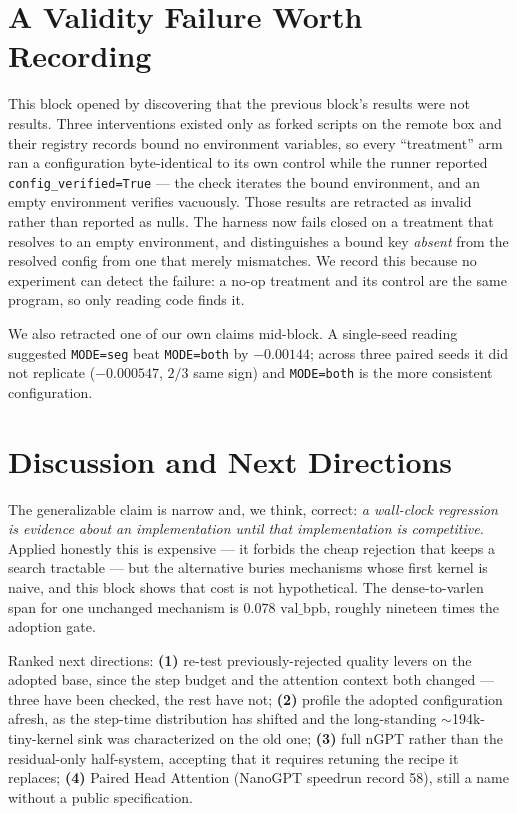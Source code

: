 \documentclass{article}
\newcommand{\valbpb}{\mathrm{val\_bpb}}
\begin{document}
\section{A Validity Failure Worth Recording}
This block opened by discovering that the previous block's results were not results. Three interventions existed only as forked scripts on the remote box and their registry records bound no environment variables, so every ``treatment'' arm ran a configuration byte-identical to its own control while the runner reported \texttt{config\_verified=True} --- the check iterates the bound environment, and an empty environment verifies vacuously. Those results are retracted as invalid rather than reported as nulls. The harness now fails closed on a treatment that resolves to an empty environment, and distinguishes a bound key \emph{absent} from the resolved config from one that merely mismatches. We record this because no experiment can detect the failure: a no-op treatment and its control are the same program, so only reading code finds it.

We also retracted one of our own claims mid-block. A single-seed reading suggested \texttt{MODE=seg} beat \texttt{MODE=both} by $-0.00144$; across three paired seeds it did not replicate ($-0.000547$, $2/3$ same sign) and \texttt{MODE=both} is the more consistent configuration.

\section{Discussion and Next Directions}
The generalizable claim is narrow and, we think, correct: \emph{a wall-clock regression is evidence about an implementation until that implementation is competitive.} Applied honestly this is expensive --- it forbids the cheap rejection that keeps a search tractable --- but the alternative buries mechanisms whose first kernel is naive, and this block shows that cost is not hypothetical. The dense-to-varlen span for one unchanged mechanism is $0.078$ $\valbpb$, roughly nineteen times the adoption gate.

Ranked next directions: \textbf{(1)} re-test previously-rejected quality levers on the adopted base, since the step budget and the attention context both changed --- three have been checked, the rest have not; \textbf{(2)} profile the adopted configuration afresh, as the step-time distribution has shifted and the long-standing $\sim$194k-tiny-kernel sink was characterized on the old one; \textbf{(3)} full nGPT rather than the residual-only half-system, accepting that it requires retuning the recipe it replaces; \textbf{(4)} Paired Head Attention (NanoGPT speedrun record 58), still a name without a public specification.
\end{document}
